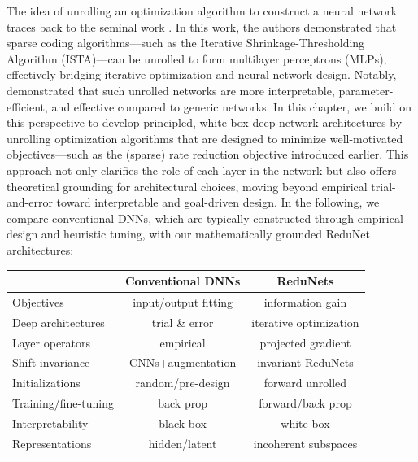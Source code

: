 \documentclass[../../book-main.tex]{subfiles}
\begin{document}


The idea of unrolling an optimization algorithm to construct a neural network traces back to the seminal work \cite{gregor2010learning}. In this work, the authors demonstrated that sparse coding algorithms—such as the Iterative Shrinkage-Thresholding Algorithm (ISTA)—can be unrolled to form multilayer perceptrons (MLPs), effectively bridging iterative optimization and neural network design. Notably, \cite{monga2019algorithm} demonstrated that such unrolled networks are more interpretable, parameter-efficient, and effective compared to generic networks. In this chapter, we build on this perspective to develop principled, white-box deep network architectures by unrolling optimization algorithms that are designed to minimize well-motivated objectives—such as the (sparse) rate reduction objective introduced earlier. This approach not only clarifies the role of each layer in the network but also offers theoretical grounding for architectural choices, moving beyond empirical trial-and-error toward interpretable and goal-driven design.  In the following, we compare conventional DNNs, which are typically constructed through empirical design and heuristic tuning, with our mathematically grounded ReduNet architectures: 

\begin{center}
\begin{tabular}{| l || c | c |}
\hline
  & Conventional DNNs & ReduNets\\ [0.5ex]
  \hline \hline
Objectives & input/output fitting & information gain\\ [0.5ex]
  \hline
Deep architectures & trial \& error & iterative optimization \\  [0.5ex]
\hline
Layer operators & empirical & projected gradient \\  [0.5ex]
\hline
Shift invariance & CNNs+augmentation & invariant ReduNets \\  [0.5ex]
\hline
Initializations & random/pre-design & forward unrolled \\ [0.5ex]
\hline
Training/fine-tuning & back prop & forward/back prop\\ [0.5ex]
\hline
Interpretability & black box & white box \\ [0.5ex]
\hline
Representations & hidden/latent & incoherent subspaces \\ [0.5ex]
\hline
\end{tabular}
\end{center}
\end{document}
